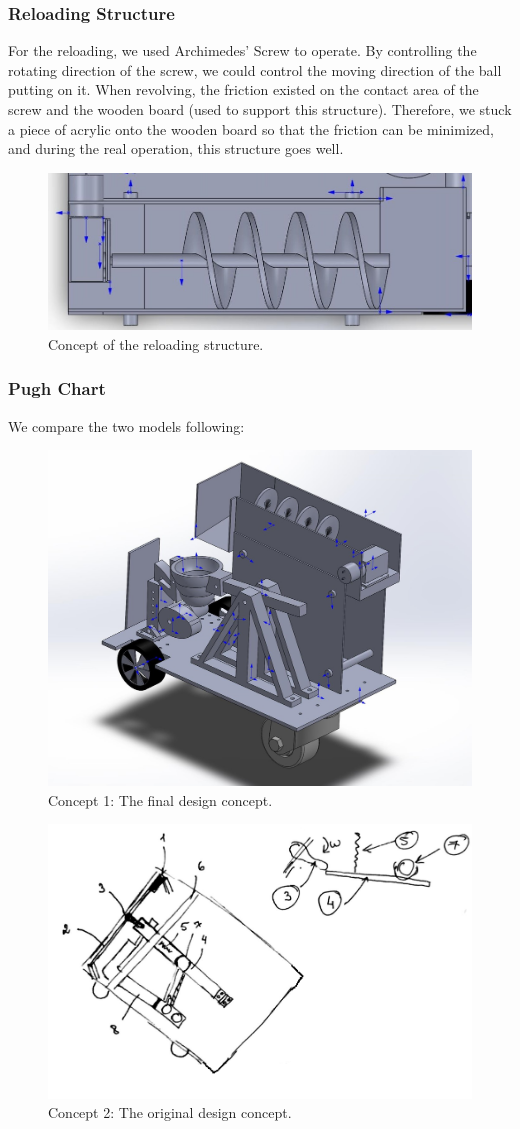 \documentclass{article}
\begin{document}
\subsubsection*{Reloading Structure}
For the reloading, we used Archimedes' Screw to operate. By controlling the rotating direction of the screw, we could control the moving direction of the ball putting on it. When revolving, the friction existed on the contact area of the screw and the wooden board (used to support this structure). Therefore, we stuck a piece of acrylic onto the wooden board so that the friction can be minimized, and during the real operation, this structure goes well.

\begin{figure}[H]
\centering
\includegraphics[width=0.6\linewidth]{Screw3}
\caption{Concept of the reloading structure.}
\end{figure}

\subsubsection*{Pugh Chart}



We compare the two models following:
\begin{figure}[H]
\centering
\includegraphics[width=0.6\linewidth]{Overall}
\caption{Concept 1: The final design concept.}
\end{figure}

\begin{figure}[H]
\centering
\includegraphics[width=0.6\linewidth]{Con1}
\caption{Concept 2: The original design concept.}
\end{figure}
\end{document}
